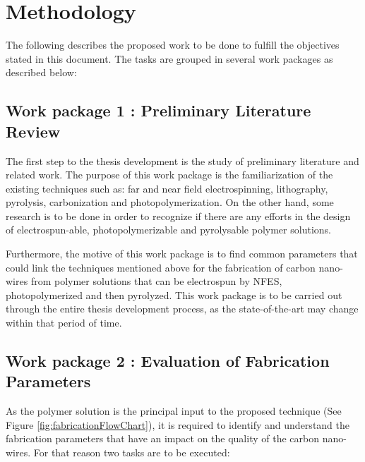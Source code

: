 
\chapter{Methodology} %

\label{Chapter:Methodology}


The following describes the proposed work to be done to fulfill the objectives stated in this document. The tasks are grouped in several work packages as described below:


\section{Work package 1 : Preliminary Literature Review}
The first step to the thesis development is the study of preliminary literature and related work. The purpose of this work package is the familiarization of the existing techniques such as: far and near field electrospinning, lithography, pyrolysis, carbonization and photopolymerization. On the other hand, some research is to be done in order to recognize if there are any efforts in the design of electrospun-able, photopolymerizable and pyrolysable polymer solutions.

Furthermore, the motive of this work package is to find common parameters that could link the techniques mentioned above for the fabrication of carbon nano-wires from polymer solutions that can be electrospun by NFES, photopolymerized and then pyrolyzed. This work package is to be carried out through the entire thesis development process, as the state-of-the-art may change within that period of time.

\section{Work package 2 : Evaluation of Fabrication Parameters}
As the polymer solution is the principal input to the proposed technique (See Figure \ref{fig:fabricationFlowChart}), it is required to identify and understand the fabrication parameters that have an impact on the quality of the carbon nano-wires. For that reason two tasks are to be executed:

